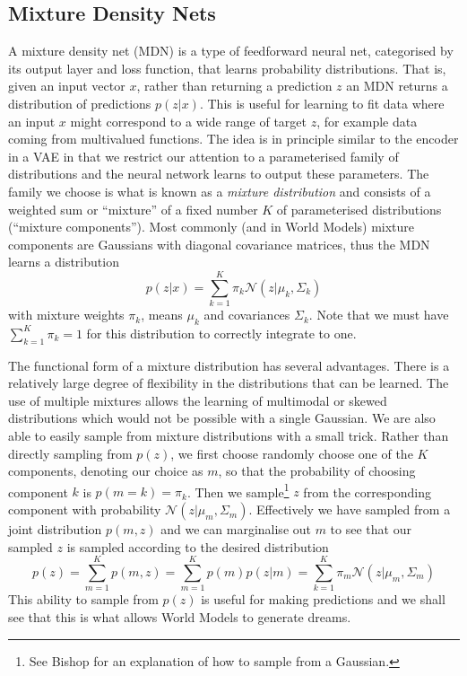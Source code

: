 \documentclass{article}
\numberwithin{figure}{section}
\theoremstyle{definition}
\begin{document}
\subsection{Mixture Density Nets}
A mixture density net (MDN) is a type of feedforward neural net, categorised by its output layer and loss function, that learns probability distributions.
That is, given an input vector $x$, rather than returning a prediction $z$ an MDN returns a distribution of predictions $p(z|x)$.
This is useful for learning to fit data where an input $x$ might correspond to a wide range of target $z$, for example data coming from multivalued functions.
The idea is in principle similar to the encoder in a VAE in that we restrict our attention to a parameterised family of distributions and the neural network learns to output these parameters.
The family we choose is what is known as a \textit{mixture distribution} and consists of a weighted sum or ``mixture'' of a fixed number $K$ of parameterised distributions (``mixture components'').
Most commonly (and in World Models) mixture components are Gaussians with diagonal covariance matrices, thus the MDN learns a distribution
$$p(z|x) = \sum_{k=1}^K \pi_k \mathcal{N}\left(z|\mu_k, \Sigma_k\right)$$
with mixture weights $\pi_k$, means $\mu_k$ and covariances $\Sigma_k$.
Note that we must have $\sum_{k=1}^K \pi_k = 1$ for this distribution to correctly integrate to one.



The functional form of a mixture distribution has several advantages.
There is a relatively large degree of flexibility in the distributions that can be learned.
The use of multiple mixtures allows the learning of multimodal or skewed distributions which would not be possible with a single Gaussian.
We are also able to easily sample from mixture distributions with a small trick.
Rather than directly sampling from $p(z)$, we first choose randomly choose one of the $K$ components, denoting our choice as $m$, so that the probability of choosing component $k$ is $p(m=k) =\pi_k$. 
Then we sample\footnote{See Bishop for an explanation of how to sample from a Gaussian.} $z$ from the corresponding component with probability $\mathcal{N}(z| \mu_m, \Sigma_m)$. %
Effectively we have sampled from a joint distribution $p(m,z)$ and we can marginalise out $m$ to see that our sampled $z$ is sampled according to the desired distribution
$$p(z) = \sum_{m=1}^K p(m,z) = \sum_{m=1}^K p(m)p(z|m) = \sum_{k=1}^K \pi_m \mathcal{N}\left(z|\mu_m, \Sigma_m\right)$$
This ability to sample from $p(z)$ is useful for making predictions and we shall see that this is what allows World Models to generate dreams.
\end{document}
